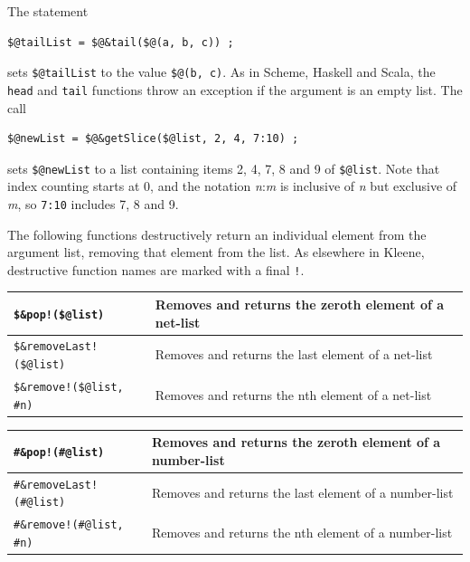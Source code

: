 \documentclass[letterpaper,12pt]{article}
\begin{document}
\vspace{.5cm}

\noindent
The statement

\begin{Verbatim}[fontsize=\small]
$@tailList = $@&tail($@(a, b, c)) ;
\end{Verbatim}

\noindent
sets \verb!$@tailList! to the value \verb!$@(b, c)!.  As in Scheme,
Haskell and Scala, the \texttt{head} and \texttt{tail} functions throw an
exception if the argument is an empty list.  The call

\begin{Verbatim}[fontsize=\small]
$@newList = $@&getSlice($@list, 2, 4, 7:10) ;
\end{Verbatim}

\noindent
sets \verb!$@newList! to a list containing items 2, 4, 7, 8 and 9 of
\verb!$@list!.  Note that index counting starts at 0, and the notation
\emph{n}:\emph{m} is inclusive of \emph{n} but exclusive of \emph{m}, so
\texttt{7:10} includes 7, 8 and 9.

The following functions destructively return an individual element from
the argument list, removing that element from the list.  As elsewhere in
Kleene, destructive function names are marked with a final \verb+!+.

\vspace{.5cm}

\noindent
\begin{tabular}{|l|p{6cm}|}
\hline
\verb+$&pop!($@list)+ & Removes and returns the zeroth element of a net-list\\
\hline
\verb+$&removeLast!($@list)+ & Removes and returns the last element of a net-list\\
\hline
\verb+$&remove!($@list, #n)+ & Removes and returns the nth element of a net-list\\
\hline
\end{tabular}

\vspace{.5cm}

\noindent
\begin{tabular}{|l|p{6cm}|}
\hline
\verb+#&pop!(#@list)+ & Removes and returns the zeroth element of a number-list\\
\hline
\verb+#&removeLast!(#@list)+ & Removes and returns the last element of a number-list\\
\hline
\verb+#&remove!(#@list, #n)+ & Removes and returns the nth element of a number-list\\
\hline
\end{tabular}
\end{document}
